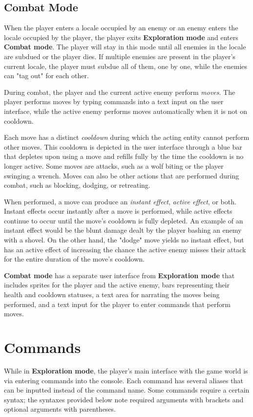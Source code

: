 \documentclass[11pt]{article}
\begin{document}
	\subsection{Combat Mode}
	
	When the player enters a locale occupied by an enemy or an enemy enters the locale occupied by the player, the player exits \textbf{Exploration mode} and enters \textbf{Combat mode}. The player will stay in this mode until all enemies in the locale are subdued or the player dies. If multiple enemies are present in the player's current locale, the player must subdue all of them, one by one, while the enemies can "tag out" for each other.
	
	During combat, the player and the current active enemy perform \textit{moves}. The player performs moves by typing commands into a text input on the user interface, while the active enemy performs moves automatically when it is not on cooldown.
	
	Each move has a distinct \textit{cooldown} during which the acting entity cannot perform other moves. This cooldown is depicted in the user interface through a blue bar that depletes upon using a move and refills fully by the time the cooldown is no longer active. Some moves are attacks, such as a wolf biting or the player swinging a wrench. Moves can also be other actions that are performed during combat, such as blocking, dodging, or retreating.
	
	When performed, a move can produce an \textit{instant effect}, \textit{active effect}, or both. Instant effects occur instantly after a move is performed, while active effects continue to occur until the move's cooldown is fully depleted. An example of an instant effect would be the blunt damage dealt by the player bashing an enemy with a shovel. On the other hand, the "dodge" move yields no instant effect, but has an active effect of increasing the chance the active enemy misses their attack for the entire duration of the move's cooldown.
	
	\textbf{Combat mode} has a separate user interface from \textbf{Exploration mode} that includes sprites for the player and the active enemy, bars representing their health and cooldown statuses, a text area for narrating the moves being performed, and a text input for the player to enter commands that perform moves.
	
	\section{Commands}
	While in \textbf{Exploration mode}, the player's main interface with the game world is via entering commands into the console. Each command has several aliases that can be inputted instead of the command name. Some commands require a certain syntax; the syntaxes provided below note required arguments with brackets and optional arguments with parentheses.
\end{document}
